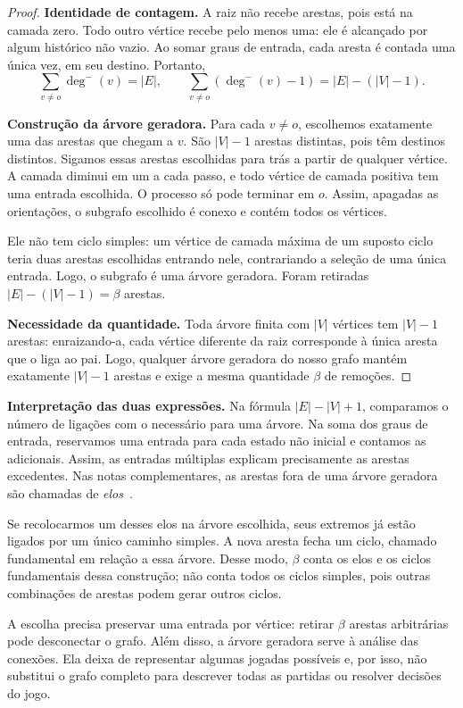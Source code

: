 \documentclass[11pt,a4paper]{article}
\theoremstyle{definition}
\newcommand{\grauin}{\deg^{-}}
\newcommand{\destaque}[1]{\par\smallskip\noindent\textbf{#1}\enspace}
\begin{document}
\begin{proof}
\textbf{Identidade de contagem.} A raiz não recebe arestas, pois está na camada zero. Todo outro vértice recebe pelo menos uma: ele é alcançado por algum histórico não vazio. Ao somar graus de entrada, cada aresta é contada uma única vez, em seu destino. Portanto,
\[
\sum_{v\ne o}\grauin(v)=|E|,
\qquad
\sum_{v\ne o}(\grauin(v)-1)=|E|-(|V|-1).
\]

\textbf{Construção da árvore geradora.} Para cada $v\ne o$, escolhemos exatamente uma das arestas que chegam a $v$. São $|V|-1$ arestas distintas, pois têm destinos distintos. Sigamos essas arestas escolhidas para trás a partir de qualquer vértice. A camada diminui em um a cada passo, e todo vértice de camada positiva tem uma entrada escolhida. O processo só pode terminar em $o$. Assim, apagadas as orientações, o subgrafo escolhido é conexo e contém todos os vértices.

Ele não tem ciclo simples: um vértice de camada máxima de um suposto ciclo teria duas arestas escolhidas entrando nele, contrariando a seleção de uma única entrada. Logo, o subgrafo é uma árvore geradora. Foram retiradas $|E|-(|V|-1)=\beta$ arestas.

\textbf{Necessidade da quantidade.} Toda árvore finita com $|V|$ vértices tem $|V|-1$ arestas: enraizando-a, cada vértice diferente da raiz corresponde à única aresta que o liga ao pai. Logo, qualquer árvore geradora do nosso grafo mantém exatamente $|V|-1$ arestas e exige a mesma quantidade $\beta$ de remoções.
\end{proof}

\destaque{Interpretação das duas expressões.}
Na fórmula $|E|-|V|+1$, comparamos o número de ligações com o necessário para uma árvore. Na soma dos graus de entrada, reservamos uma entrada para cada estado não inicial e contamos as adicionais. Assim, as entradas múltiplas explicam precisamente as arestas excedentes. Nas notas complementares, as arestas fora de uma árvore geradora são chamadas de \emph{elos}~\cite[p.~130]{rangel}.

Se recolocarmos um desses elos na árvore escolhida, seus extremos já estão ligados por um único caminho simples. A nova aresta fecha um ciclo, chamado fundamental em relação a essa árvore. Desse modo, $\beta$ conta os elos e os ciclos fundamentais dessa construção; não conta todos os ciclos simples, pois outras combinações de arestas podem gerar outros ciclos.

A escolha precisa preservar uma entrada por vértice: retirar $\beta$ arestas arbitrárias pode desconectar o grafo. Além disso, a árvore geradora serve à análise das conexões. Ela deixa de representar algumas jogadas possíveis e, por isso, não substitui o grafo completo para descrever todas as partidas ou resolver decisões do jogo.
\end{document}
